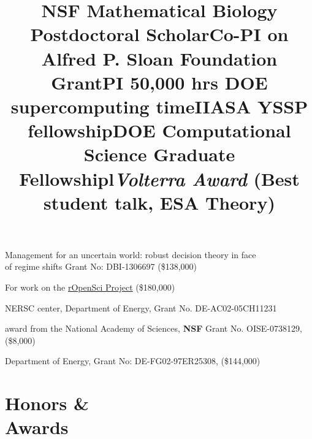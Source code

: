 \documentclass[margin]{res}
\begin{document}
\begin{resume}
\title{\textbf{NSF} Mathematical Biology Postdoctoral Scholar}
\begin{position}
  Management for an uncertain world: robust decision theory in face \\
  of regime shifts Grant No:  DBI-1306697 (\$138,000)
  \vspace{-.25cm}
\end{position}

\title{Co-PI on \textbf{Alfred P. Sloan Foundation} Grant}
\begin{position}
  For work on the \href{http://ropensci.org}{rOpenSci Project}  (\$180,000)
  \vspace{-.25cm}
\end{position}

\title{PI 50,000 hrs \textbf{DOE} supercomputing time}
\begin{position} 
  NERSC center, Department of Energy, Grant No. DE-AC02-05CH11231
  \vspace{-.25cm}
\end{position}

\title{\textbf{IIASA} YSSP fellowship}
\begin{position} 
  award from the National Academy of Sciences, \textbf{NSF} Grant No. OISE-0738129, (\$8,000)
  \vspace{-.25cm}
\end{position}

\title{\textbf{DOE} Computational Science Graduate Fellowship}
\begin{position} 
  Department of Energy, Grant No: DE-FG02-97ER25308, (\$144,000)
  \vspace{-.25cm}
\end{position}


\section{Honors \& \\ Awards}
\begin{format}
\title{l}\\
\body
\end{format}

\title{\emph{Volterra Award} (Best student talk, ESA Theory)}
\begin{position} \vspace{-.8cm} \end{position}


\end{resume}
\end{document}
